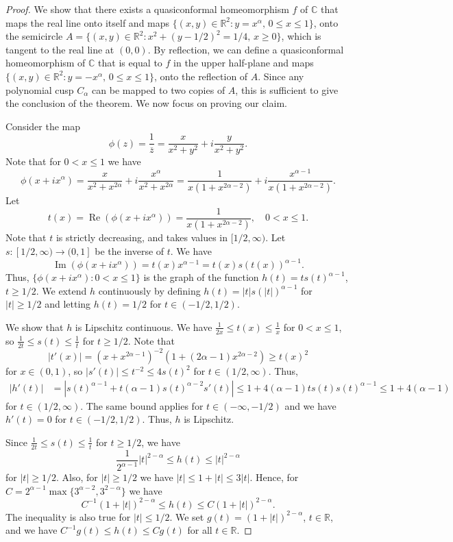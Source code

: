 \documentclass[letterpaper]{amsart}
\theoremstyle{plain}
\theoremstyle{definition}
\theoremstyle{remark}
\numberwithin{equation}{section}
\numberwithin{theorem}{section}
\renewcommand{\bar}{\overline}
\newcommand{\R}{\mathbb R}
\newcommand{\C}{\mathbb C}
\DeclareMathOperator{\re}{Re}
\DeclareMathOperator{\im}{Im}
\begin{document}
\begin{proof}
We show that there exists a quasiconformal homeomorphism $f$ of $\C$ that maps the real line onto itself and maps $\{(x,y)\in \R^2: y=x^\alpha,\, 0\leq x\leq 1\}$, onto the semicircle $A=\{(x,y)\in \R^2:x^2+(y-1/2)^2=1/4,\, x\geq 0\}$, which is tangent to the real line at $(0,0)$. By reflection, we can define a quasiconformal homeomorphism of $\C$ that is equal to $f$ in the upper half-plane and maps $\{(x,y)\in \R^2: y=-x^\alpha,\, 0\leq x\leq 1\}$, onto the reflection of $A$. Since any polynomial cusp $C_\alpha$ can be mapped to two copies of $A$, this is sufficient to give the conclusion of the theorem. We now focus on proving our claim.

Consider the map
$$\phi(z)=\frac{1}{\bar z}= \frac{x}{x^2+y^2}+i \frac{y}{x^2+y^2}.$$
Note that for $0<x\leq1$ we have
$$\phi(x+ix^\alpha)= \frac{x}{x^2+x^{2\alpha}}+i \frac{x^\alpha}{x^2+x^{2\alpha}}= \frac{1}{x(1+x^{2\alpha-2})}+ i \frac{x^{\alpha-1}}{x(1+x^{2\alpha-2})}.$$
Let 
$$t(x)= \re(\phi(x+ix^\alpha))=\frac{1}{x(1+x^{2\alpha-2})},\quad 0<x\leq 1. $$ 
Note that $t$ is strictly decreasing, and takes values in $[1/2,\infty)$. Let $s\colon [1/2,\infty)\to (0,1]$ be the inverse of $t$. We have
$$ \im(\phi(x+ix^\alpha)) = t(x)x^{\alpha-1}=t(x)s(t(x))^{\alpha-1}.$$
Thus, $\{\phi(x+ix^\alpha): 0<x\leq 1\}$ is the graph of the function $h(t)=ts(t)^{\alpha-1}$, $t\geq 1/2$. We extend $h$ continuously by defining $h(t)=|t|s(|t|)^{\alpha-1}$ for $|t|\geq 1/2$ and letting $h(t)=1/2$ for $t\in (-1/2,1/2)$. 

We show that $h$ is Lipschitz continuous. We have $\frac{1}{2x}\leq t(x)\leq \frac{1}{x}$ for $0<x\leq 1$, so $\frac{1}{2t}\leq s(t)\leq \frac{1}{t}$ for $t\geq 1/2$.  Note that 
$$|t'(x)|=(x+x^{2\alpha-1})^{-2}(1+(2\alpha-1)x^{2\alpha-2}) \geq t(x)^2$$
for $x\in (0,1)$, so $|s'(t)|\leq t^{-2}\leq 4s(t)^2$ for $t\in (1/2,\infty)$. Thus,
\begin{align*}
|h'(t)|&=|s(t)^{\alpha-1}+t(\alpha-1)s(t)^{\alpha-2} s'(t)|\leq 1+4(\alpha-1)ts(t)s(t)^{\alpha-1} \leq 1+4(\alpha-1)
\end{align*}
for $t\in (1/2,\infty)$. The same bound applies for $t\in (-\infty,-1/2)$ and we have $h'(t)=0$ for $t\in (-1/2,1/2)$. Thus, $h$ is Lipschitz. 

Since $\frac{1}{2t}\leq s(t)\leq \frac{1}{t}$ for $t\geq 1/2$, we have
$$ \frac{1}{2^{\alpha-1}}|t|^{2-\alpha}\leq h(t) \leq |t|^{2-\alpha}$$
for $|t|\geq 1/2$. Also, for $|t|\geq 1/2$ we have  $|t|\leq 1+|t|\leq 3|t|$. 
Hence, for $C=2^{\alpha-1}\max\{3^{\alpha-2},3^{2-\alpha}\}$ we have
$$C^{-1}(1+|t|)^{2-\alpha}\leq h(t) \leq C(1+|t|)^{2-\alpha}.$$
The inequality is also true for $|t|\leq 1/2$. We set $g(t)=(1+|t|)^{2-\alpha}$, $t\in \R$, and we have $C^{-1}g(t)\leq h(t)\leq Cg(t)$ for all $t\in \R$. 


\end{proof}
\end{document}
